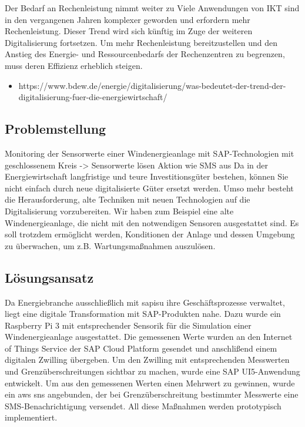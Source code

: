 Der Bedarf an Rechenleistung nimmt weiter zu
Viele Anwendungen von IKT sind in den vergangenen Jahren komplexer geworden und erfordern mehr Rechenleistung. Dieser Trend wird sich künftig im Zuge der weiteren Digitalisierung fortsetzen. Um mehr Rechenleistung bereitzustellen und den Anstieg des Energie- und Ressourcenbedarfs der Rechenzentren zu begrenzen, muss deren Effizienz erheblich steigen.

\begin{itemize}
  \item https://www.bdew.de/energie/digitalisierung/was-bedeutet-der-trend-der-digitalisierung-fuer-die-energiewirtschaft/
\end{itemize}

\subsection{Problemstellung}
Monitoring der Sensorwerte einer Windenergieanlage mit SAP-Technologien mit geschlossenem Kreis -> Sensorwerte lösen Aktion wie SMS aus
\newline
Da in der Energiewirtschaft langfristige und teure Investitionsgüter bestehen, können Sie nicht einfach durch neue
digitalisierte Güter ersetzt werden. Umso mehr besteht die Herausforderung, alte Techniken mit neuen Technologien
auf die Digitalisierung vorzubereiten. Wir haben zum Beispiel eine alte Windenergieanlage, die nicht mit den
notwendigen Sensoren ausgestattet sind. Es soll trotzdem ermöglicht werden, Konditionen der Anlage und dessen Umgebung
zu überwachen, um z.B. Wartungsmaßnahmen auszulösen.

\subsection{Lösungsansatz}

Da Energiebranche ausschließlich mit \acf{sapisu} ihre Geschäftsprozesse verwaltet, liegt eine digitale Transformation
mit SAP-Produkten nahe. Dazu wurde ein Raspberry Pi 3 mit entsprechender Sensorik für die Simulation einer Windenergieanlage
ausgestattet. Die gemessenen Werte wurden an den Internet of Things Service der SAP Cloud Platform gesendet und anschlißend
einem digitalen Zwilling übergeben. Um den Zwilling mit entsprechenden Messwerten und Grenzüberschreitungen
sichtbar zu machen, wurde eine SAP UI5-Anwendung entwickelt. Um aus den gemessenen Werten einen Mehrwert zu gewinnen,
wurde ein \acf{aws} \acf{sns} angebunden, der bei Grenzüberschreitung bestimmter Messwerte eine
SMS-Benachrichtigung versendet. All diese Maßnahmen werden prototypisch implementiert.

